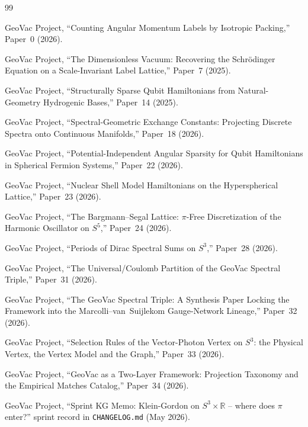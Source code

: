 \documentclass[11pt]{article}
\begin{document}
\begin{thebibliography}{99}

GeoVac Project, ``Counting Angular Momentum Labels by Isotropic Packing,'' Paper~0 (2026).

GeoVac Project, ``The Dimensionless Vacuum: Recovering the Schr\"odinger Equation on a Scale-Invariant Label Lattice,'' Paper~7 (2025).

GeoVac Project, ``Structurally Sparse Qubit Hamiltonians from Natural-Geometry Hydrogenic Bases,'' Paper~14 (2025).

GeoVac Project, ``Spectral-Geometric Exchange Constants: Projecting Discrete Spectra onto Continuous Manifolds,'' Paper~18
(2026).

GeoVac Project, ``Potential-Independent Angular Sparsity for Qubit Hamiltonians in Spherical Fermion Systems,''
Paper~22 (2026).

GeoVac Project, ``Nuclear Shell Model Hamiltonians on the Hyperspherical Lattice,''
Paper~23 (2026).

GeoVac Project, ``The Bargmann--Segal Lattice: $\pi$-Free Discretization of the Harmonic Oscillator on $S^5$,'' Paper~24
(2026).

GeoVac Project, ``Periods of Dirac Spectral Sums on $S^3$,''
Paper~28 (2026).

GeoVac Project, ``The Universal/Coulomb Partition of the GeoVac Spectral Triple,'' Paper~31 (2026).

GeoVac Project, ``The GeoVac Spectral Triple: A Synthesis Paper Locking the Framework into the Marcolli--van~Suijlekom Gauge-Network Lineage,''
Paper~32 (2026).

GeoVac Project, ``Selection Rules of the Vector-Photon Vertex on $S^3$:
the Physical Vertex, the Vertex Model and the Graph,'' Paper~33 (2026).

GeoVac Project, ``GeoVac as a Two-Layer Framework: Projection
Taxonomy and the Empirical Matches Catalog,'' Paper~34 (2026).

GeoVac Project, ``Sprint KG Memo: Klein-Gordon on $S^3 \times
\mathbb{R}$ -- where does $\pi$ enter?''
sprint record in \texttt{CHANGELOG.md} (May 2026).


\end{thebibliography}
\end{document}
